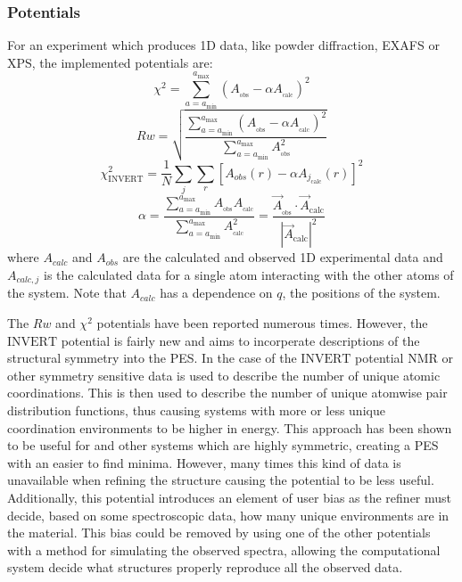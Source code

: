 \subsubsection{Potentials}
For an experiment which produces 1D data, like powder diffraction, EXAFS or XPS, the implemented potentials are:
\begin{equation} \label{chi}
\chi^{2} = 
\sum_{a=a_\mathrm{min}}^{a_\mathrm{max}} \left(A_{_\mathrm{obs}} - \alpha A_{_\mathrm{calc}}\right)^{2}
\end{equation}
\begin{equation}\label{Rw}
Rw = 
\sqrt{\frac{\sum_{a=a_\mathrm{min}}^{a_\mathrm{max}} \left(A_{_\mathrm{obs}} - \alpha A_{_\mathrm{calc}}\right)^{2}}{\sum_{a=a_\mathrm{min}}^{a_\mathrm{max}} A_{_\mathrm{obs}}^{2}}}
\end{equation}
\begin{equation}\label{INVERT}
  \chi^{2}_{\mathrm{INVERT}} = \frac{1}{N}\sum_{j}\sum_{r}[A_{obs}(r) - \alpha A_{j_\mathrm{calc}}(r)]^{2}
\end{equation}
\begin{equation} \label{alpha}
\alpha  = \frac{\sum_{a=a_\mathrm{min}}^{a_\mathrm{max}}A_\mathrm{_\mathrm{obs}}A_{_\mathrm{calc}}}{\sum_{a=a_\mathrm{min}}^{a_\mathrm{max}} A_{_\mathrm{calc}}^{2}} = \frac{\vec{A}_{_\mathrm{obs}}\cdot\vec{A}_\mathrm{calc}}{|\vec{A}_\mathrm{calc}|^{2}}
\end{equation}
where $A_{calc}$ and $A_{obs}$ are the calculated and observed 1D experimental data
and $A_{calc, j}$ is the calculated data for a single atom interacting with the other atoms of the system. 
Note that $A_{calc}$ has a dependence on $q$, the positions of the system.

The $Rw$ and $\chi^{2}$ potentials have been reported numerous times. \cite{ALL THE THINGS}
However, the $\mathrm{INVERT}$ potential is fairly new and aims to incorperate descriptions of the structural symmetry into the PES. \cite{Cliffe2010, Cliffe2013}
In the case of the $\mathrm{INVERT}$ potential NMR or other symmetry sensitive data is used to describe the number of unique atomic coordinations.
This is then used to describe the number of unique atomwise pair distribution functions, thus causing systems with more or less unique coordination environments to be higher in energy.
This approach has been shown to be useful for  and other systems which are highly symmetric, creating a PES with an easier to find minima. \cite{Cliffe2010, Cliffe2013}
However, many times this kind of data is unavailable when refining the structure causing the potential to be less useful.
Additionally, this potential introduces an element of user bias as the refiner must decide, based on some spectroscopic data, how many unique environments are in the material.
This bias could be removed by using one of the other potentials with a method for simulating the observed spectra, allowing the computational system decide what structures properly reproduce all the observed data.


